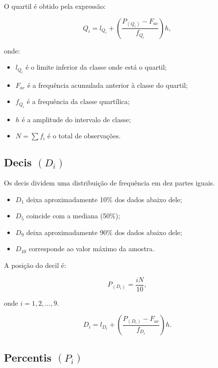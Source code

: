 O quartil é obtido pela expressão:

\begin{equation}\label{eq:quartil}
Q_i=
l_{Q_i}+
\left(
\frac{P_{(Q_i)}-F_{ac}}{f_{Q_i}}
\right)h,
\end{equation}


onde:
\begin{itemize}
    \item $l_{Q_i}$ é o limite inferior da classe onde está o quartil;
    \item $F_{ac}$ é a frequência acumulada anterior à classe do quartil;
    \item $f_{Q_i}$ é a frequência da classe quartílica;
    \item $h$ é a amplitude do intervalo de classe;
    \item $N=\sum f_i$ é o total de observações.
\end{itemize}


\subsection{Decis $(D_i)$}

Os decis dividem uma distribuição de frequência em dez partes iguais.

\begin{itemize}
    \item $D_1$ deixa aproximadamente 10\% dos dados abaixo dele;
    \item $D_5$ coincide com a mediana (50\%);
    \item $D_9$ deixa aproximadamente 90\% dos dados abaixo dele;
    \item $D_{10}$ corresponde ao valor máximo da amostra.
\end{itemize}

A posição do decil é:

\begin{equation}
P_{(D_i)}=\frac{iN}{10},
\end{equation}

onde $i=1,2,\ldots,9$.

\begin{equation}\label{eq:decil}
D_i=
l_{D_i}+
\left(
\frac{P_{(D_i)}-F_{ac}}{f_{D_i}}
\right)h.
\end{equation}
\subsection{Percentis $(P_i)$}

